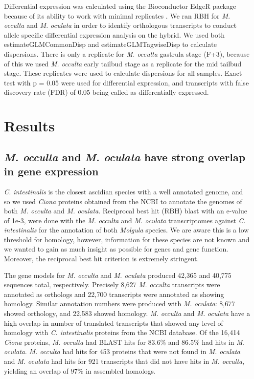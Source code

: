 Differential expression was calculated using the Bioconductor EdgeR package because of its ability to work with minimal replicates \cite{robinson_edger:_2010}. We ran RBH  for \textit{M. occulta} and \textit{M. oculata} in order to identify orthologous transcripts to conduct allele specific differential expression analysis on the hybrid. We used both estimateGLMCommonDisp and estimateGLMTagwiseDisp to calculate dispersions. There is only a replicate for \textit{M. occulta} gastrula stage (F+3), because of this we used \textit{M. occulta} early tailbud stage as a replicate for the mid tailbud stage. These replicates were used to calculate dispersions for all samples. Exact-test with p = 0.05 were used for differential expression, and transcripts with false discovery rate (FDR) of 0.05 being called as differentially expressed. 

\section{Results}
\subsection{\textit{M. occulta} and \textit{M. oculata} have strong overlap in gene expression}
\textit{C. intestinalis} is the closest ascidian species with a well annotated genome, and so we used \textit{Ciona} proteins obtained from the NCBI to annotate the genomes of both \textit{M. occulta} and \textit{M. oculata}. Reciprocal best hit (RBH) blast with an e-value of 1e-3, were done with the \textit{M. occulta} and \textit{M. oculata} transcriptomes against \textit{C. intestinalis} for the annotation of both \textit{Molgula} species.  We are aware this is a low threshold for homology, however, information for these species are not known and we wanted to gain as much insight as possible for genes and gene function. Moreover, the reciprocal best hit criterion is extremely stringent.

The gene models for \textit{M. occulta} and \textit{M. oculata} produced 42,365 and 40,775 sequences total, respectively. Precisely 8,627 \textit{M. occulta} transcripts were annotated as orthologs and 22,700 transcripts were annotated as showing homology. Similar annotation numbers were produced with \textit{M. oculata}: 8,677 showed orthology, and 22,583 showed homology. \textit{M. occulta} and \textit{M. oculata} have a high overlap in number of translated transcripts that showed any level of homology with \textit{C. intestinalis} proteins from the NCBI database. Of the 16,414 {\em Ciona} proteins, \textit{M. occulta} had BLAST hits for 83.6\% and 86.5\% had hits in \textit{M. oculata}. \textit{M. occulta} had hits for 453 proteins that were not found in \textit{M. oculata} and \textit{M. oculata} had hits for 921 transcripts that did not have hits in \textit{M. occulta}, yielding an overlap of 97\% in assembled homologs.

